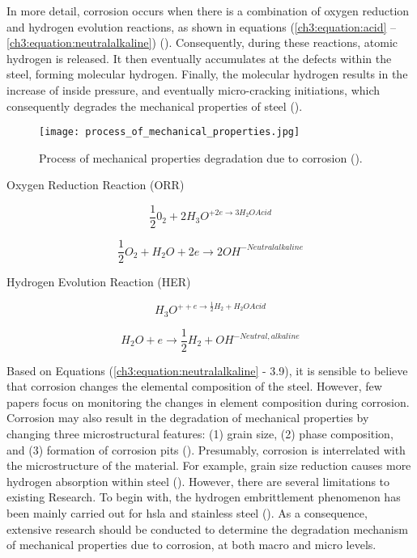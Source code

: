 In more detail, corrosion occurs when there is a combination of oxygen reduction and hydrogen evolution reactions, as shown in equations (\ref{ch3:equation:acid} – \ref{ch3:equation:neutralalkaline}) (\cite{li2018effect}).  Consequently, during these reactions, atomic hydrogen is released. It then eventually accumulates at the defects within the steel, forming molecular hydrogen. Finally, the molecular hydrogen results in the increase of inside pressure, and eventually micro-cracking initiations, which consequently degrades the mechanical properties of steel (\cite{whitman1924effect}).
 
\begin{figure}[H]
    \centering
    \texttt{[image: process\_of\_mechanical\_properties.jpg]}
    \caption{Process of mechanical properties degradation due to corrosion (\cite{protopopoff2011surface}).}
    \label{ch3:figure:degradation}
\end{figure}

Oxygen Reduction Reaction (ORR)

\begin{equation}
    \frac{1}{2}0_2 + 2H_3O^{+2e \rightarrow 3H_2OAcid}
    \label{ch3:equation:acid}
\end{equation}

\begin{equation}
    \frac{1}{2}O_2 + H_2O + 2e \rightarrow 2OH^{-Neutralalkaline}
\end{equation}

Hydrogen Evolution Reaction (HER)

\begin{equation}
    H_3O^{++e \rightarrow \frac{1}{2}H_2 + H_2OAcid}
\end{equation}

\begin{equation}
    H_2O + e \rightarrow \frac{1}{2}H_2 + OH^{-Neutral,alkaline}
    \label{ch3:equation:neutralalkaline}
\end{equation}

Based on Equations (\ref{ch3:equation:neutralalkaline} - 3.9), it is sensible to believe that corrosion changes the elemental composition of the steel. However, few papers focus on monitoring the changes in element composition during corrosion. Corrosion may also result in the degradation of mechanical properties by changing three microstructural features: (1) grain size, (2) phase composition, and (3) formation of corrosion pits (\cite{li2018effect}). Presumably, corrosion is interrelated with the microstructure of the material. For example, grain size reduction causes more hydrogen absorption within steel (\cite{li2018effect}). However, there are several limitations to existing Research. To begin with, the hydrogen embrittlement phenomenon has been mainly carried out for \acrfull{hsla} and stainless steel (\cite{li2018effect}). As a consequence, extensive research should be conducted to determine the degradation mechanism of mechanical properties due to corrosion, at both macro and micro levels.

